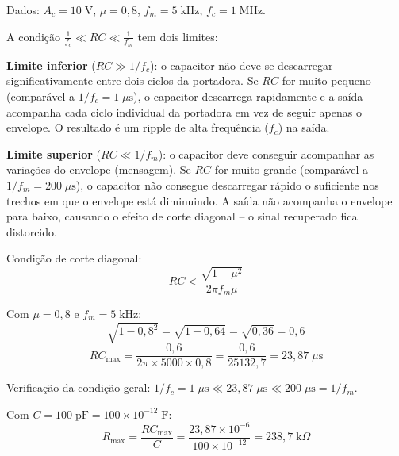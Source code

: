 \documentclass[11pt,a4paper]{article}
\begin{document}
Dados: $A_c = 10\;\text{V}$, $\mu = 0{,}8$, $f_m = 5\;\text{kHz}$, $f_c = 1\;\text{MHz}$.

\begin{resolucao}

A condição $\frac{1}{f_c} \ll RC \ll \frac{1}{f_m}$ tem dois limites:

\textbf{Limite inferior} ($RC \gg 1/f_c$): o capacitor não deve se descarregar significativamente entre dois ciclos da portadora. Se $RC$ for muito pequeno (comparável a $1/f_c = 1\;\mu\text{s}$), o capacitor descarrega rapidamente e a saída acompanha cada ciclo individual da portadora em vez de seguir apenas o envelope. O resultado é um ripple de alta frequência ($f_c$) na saída.

\textbf{Limite superior} ($RC \ll 1/f_m$): o capacitor deve conseguir acompanhar as variações do envelope (mensagem). Se $RC$ for muito grande (comparável a $1/f_m = 200\;\mu\text{s}$), o capacitor não consegue descarregar rápido o suficiente nos trechos em que o envelope está diminuindo. A saída não acompanha o envelope para baixo, causando o efeito de corte diagonal -- o sinal recuperado fica distorcido.
\end{resolucao}

\begin{resolucao}

Condição de corte diagonal:
\[
  RC < \frac{\sqrt{1 - \mu^2}}{2\pi f_m \mu}
\]

Com $\mu = 0{,}8$ e $f_m = 5\;\text{kHz}$:
\[
  \sqrt{1 - 0{,}8^2} = \sqrt{1 - 0{,}64} = \sqrt{0{,}36} = 0{,}6
\]
\[
  RC_{\max} = \frac{0{,}6}{2\pi \times 5000 \times 0{,}8} = \frac{0{,}6}{25132{,}7} = \boxed{23{,}87\;\mu\text{s}}
\]

Verificação da condição geral: $1/f_c = 1\;\mu\text{s} \ll 23{,}87\;\mu\text{s} \ll 200\;\mu\text{s} = 1/f_m$. \checkmark

Com $C = 100\;\text{pF} = 100 \times 10^{-12}\;\text{F}$:
\[
  R_{\max} = \frac{RC_{\max}}{C} = \frac{23{,}87 \times 10^{-6}}{100 \times 10^{-12}} = \boxed{238{,}7\;\text{k}\Omega}
\]
\end{resolucao}
\end{document}
